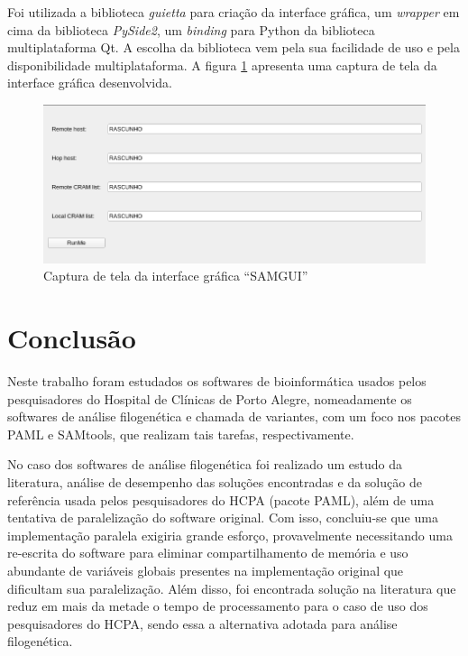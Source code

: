 \documentclass[cic,tc]{iiufrgs}
\begin{document}
Foi utilizada a biblioteca \textit{guietta} para criação da interface
gráfica,\cite{guietta} um \textit{wrapper} em cima da biblioteca
\textit{PySide2}, um \textit{binding} para Python da biblioteca multiplataforma
Qt.\cite{loganathan2013pyside} A escolha da biblioteca vem pela sua facilidade
de uso e pela disponibilidade multiplataforma. A figura \ref{fig:samgui}
apresenta uma captura de tela da interface gráfica desenvolvida.

\begin{figure}
  \caption{Captura de tela da interface gráfica ``SAMGUI''}
    \begin{center}
      \includegraphics[width=0.85\linewidth]{img/samgui.png}
    \end{center}
    \label{fig:samgui}
\end{figure}

\chapter{Conclusão}

Neste trabalho foram estudados os softwares de bioinformática usados pelos
pesquisadores do Hospital de Clínicas de Porto Alegre, nomeadamente os
softwares de análise filogenética e chamada de variantes, com um foco nos
pacotes PAML e SAMtools, que realizam tais tarefas, respectivamente.

No caso dos softwares de análise filogenética foi realizado um estudo da
literatura, análise de desempenho das soluções encontradas e da solução de
referência usada pelos pesquisadores do HCPA (pacote PAML), além de uma
tentativa de paralelização do software original. Com isso, concluiu-se que uma
implementação paralela exigiria grande esforço, provavelmente necessitando uma
re-escrita do software para eliminar compartilhamento de memória e uso
abundante de variáveis globais presentes na implementação original que
dificultam sua paralelização. Além disso, foi encontrada solução na literatura
que reduz em mais da metade o tempo de processamento para o caso de uso dos
pesquisadores do HCPA, sendo essa a alternativa adotada para análise
filogenética.
\end{document}

